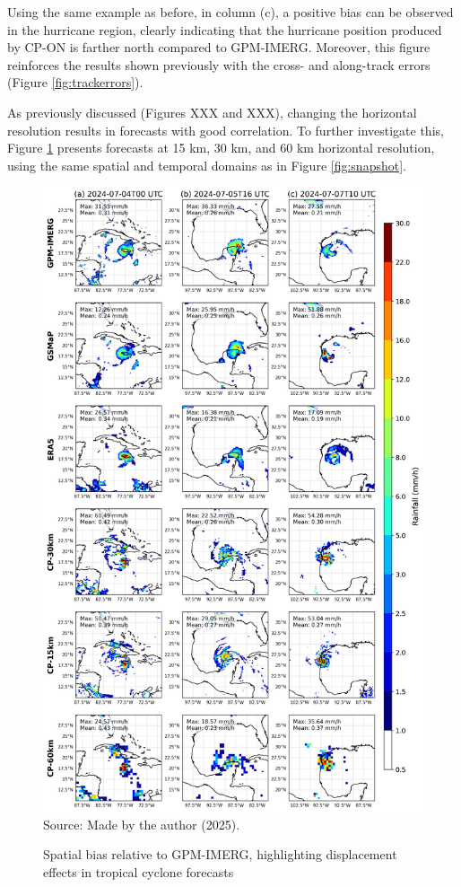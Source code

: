 Using the same example as before, in column (c), a positive bias can be observed in the hurricane region, clearly indicating that the hurricane position produced by CP-ON is farther north compared to GPM-IMERG. Moreover, this figure reinforces the results shown previously with the cross- and along-track errors (Figure \ref{fig:trackerrors}).

As previously discussed (Figures XXX and XXX), changing the horizontal resolution results in forecasts with good correlation. To further investigate this, Figure \ref{fig:biasgpm2} presents forecasts at 15 km, 30 km, and 60 km horizontal resolution, using the same spatial and temporal domains as in Figure \ref{fig:snapshot}.

\begin{figure}[!ht]
	\centering
	\caption{Spatial bias relative to GPM-IMERG, highlighting displacement effects in tropical cyclone forecasts} %
	\includegraphics[width=\textwidth]{docs/figuras/chapter5/painel_resolution_rainfall_FINAL.png} 
	\vspace{0.5em}
	Source: Made by the author (2025).  %
	\label{fig:biasgpm2} %
\end{figure}

